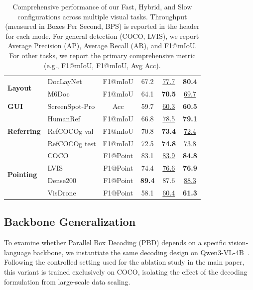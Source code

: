 \documentclass{llmxive}
\begin{document}
\begin{table}[!t]
{\begin{tabular}{ll c | c | c | c}
            \multirow{2}{*}{\textbf{Layout}} 
            & DocLayNet & F1@mIoU & 67.2 & \underline{77.7} & \textbf{80.4} \\
            & M6Doc & F1@mIoU & 64.1 & \textbf{70.5} & \underline{69.7} \\
            \midrule

            \textbf{GUI} 
            & ScreenSpot-Pro & Acc & 59.7 & \underline{60.3} & \textbf{60.5} \\
            \midrule

            \multirow{3}{*}{\textbf{Referring}} 
            & HumanRef & F1@mIoU & 66.8 & \underline{78.5} & \textbf{79.1} \\
            & RefCOCOg val & F1@mIoU & 70.8 & \textbf{73.4} & \underline{72.4} \\
            & RefCOCOg test & F1@mIoU & 72.5 & \textbf{74.8} & \underline{73.8} \\
            \midrule
            
            
            \multirow{4}{*}{\textbf{Pointing}} 
            & COCO & F1@Point & 83.1 & \underline{83.9} & \textbf{84.8} \\
            & LVIS & F1@Point & 74.4 & \underline{76.6} & \textbf{76.9} \\
            & Dense200 & F1@Point & \textbf{89.4} & 87.6 & \underline{88.3} \\
            & VisDrone & F1@Point & 58.1 & \underline{60.4} & \textbf{61.3} \\

            \bottomrule
        \end{tabular}
    }
\vspace{-2mm}
\caption{Comprehensive performance of our Fast, Hybrid, and Slow configurations across multiple visual tasks. Throughput (measured in Boxes Per Second, BPS) is reported in the header for each mode. For general detection (COCO, LVIS), we report Average Precision (AP), Average Recall (AR), and F1@mIoU. For other tasks, we report the primary comprehensive metric (e.g., F1@mIoU, F1@mIoU, Avg Acc).}
\label{tab:grand_summary_tasks}
\end{table}

\subsection{Backbone Generalization}
To examine whether Parallel Box Decoding (PBD) depends on a specific vision-language backbone, we instantiate the same decoding design on Qwen3-VL-4B~\citep{bai2025qwen3vltechnicalreport}. Following the controlled setting used for the ablation study in the main paper, this variant is trained exclusively on COCO, isolating the effect of the decoding formulation from large-scale data scaling.
\end{document}
